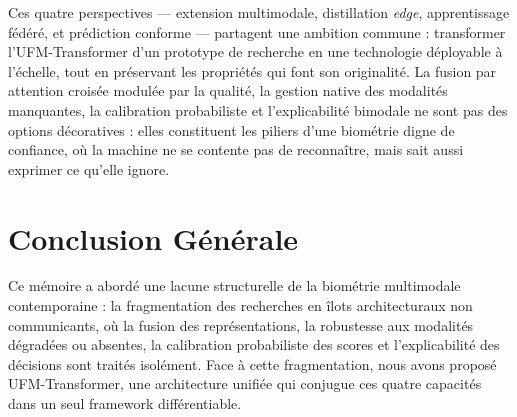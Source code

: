 \documentclass[12pt,a4paper]{report}
\begin{document}
\vspace{0.5em}

Ces quatre perspectives --- extension multimodale, distillation \emph{edge}, apprentissage f\'{e}d\'{e}r\'{e}, et pr\'{e}diction conforme --- partagent une ambition commune : transformer l'UFM-Transformer d'un prototype de recherche en une technologie d\'{e}ployable \`{a} l'\'{e}chelle, tout en pr\'{e}servant les propri\'{e}t\'{e}s qui font son originalit\'{e}. La fusion par attention crois\'{e}e modul\'{e}e par la qualit\'{e}, la gestion native des modalit\'{e}s manquantes, la calibration probabiliste et l'explicabilit\'{e} bimodale ne sont pas des options d\'{e}coratives : elles constituent les piliers d'une biom\'{e}trie digne de confiance, o\`{u} la machine ne se contente pas de reconna\^{i}tre, mais sait aussi exprimer ce qu'elle ignore.


\chapter*{Conclusion G\'{e}n\'{e}rale}

Ce m\'{e}moire a abord\'{e} une lacune structurelle de la biom\'{e}trie multimodale contemporaine : la fragmentation des recherches en \^{i}lots architecturaux non communicants, o\`{u} la fusion des repr\'{e}sentations, la robustesse aux modalit\'{e}s d\'{e}grad\'{e}es ou absentes, la calibration probabiliste des scores et l'explicabilit\'{e} des d\'{e}cisions sont trait\'{e}s isol\'{e}ment. Face \`{a} cette fragmentation, nous avons propos\'{e} UFM-Transformer, une architecture unifi\'{e}e qui conjugue ces quatre capacit\'{e}s dans un seul framework diff\'{e}rentiable.
\end{document}
